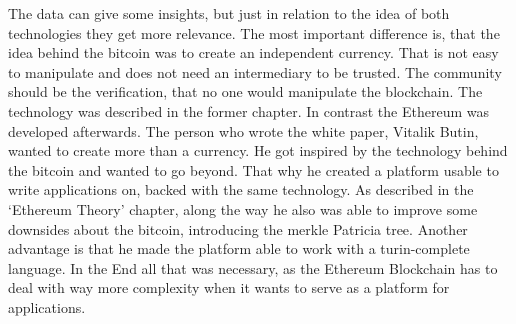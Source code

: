 The data can give some insights, but just in relation to the idea of both technologies they get more relevance. 
The most important difference is, that the idea behind the bitcoin was to create an independent currency.
That is not easy to manipulate and does not need an intermediary to be trusted. 
The community should be the verification, that no one would manipulate the blockchain. 
The technology was described in the former chapter. 
In contrast the Ethereum was developed afterwards. 
The person who wrote the white paper, Vitalik Butin, wanted to create more than a currency. 
He got inspired by the technology behind the bitcoin and wanted to go beyond. 
That why he created a platform usable to write applications on, backed with the same technology. 
As described in the ‘Ethereum Theory’ chapter, along the way he also was able to improve some downsides about the bitcoin, introducing the merkle Patricia tree. 
Another advantage is that he made the platform able to work with a turin-complete language. 
In the End all that was necessary, as the Ethereum Blockchain has to deal with way more complexity when it wants to serve as a platform for applications.

